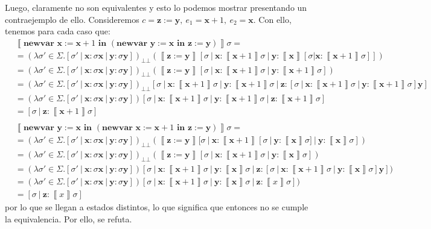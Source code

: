 \documentclass{article}
\newcommand{\sem}[1]{\left\llbracket #1\right\rrbracket}
\newcommand{\x}{\textbf{x}}
\newcommand{\y}{\textbf{y}}
\newcommand{\z}{\textbf{z}}
\newcommand{\bbot}{\bot\!\!\!\bot}
\newcommand{\cnewvar}[3]{\textbf{newvar }#1 := #2\textbf{ in }#3}
\begin{document}
Luego, claramente no son equivalentes y esto lo podemos mostrar presentando un contraejemplo de ello.
Consideremos $c = \z := \y,\ e_1 = \x + 1,\ e_2 = \x$.
Con ello, tenemos para cada caso que:
\begin{equation*}
  \begin{aligned}
    &\sem{\cnewvar{\x}{\x + 1}{(\cnewvar{\y}{\x}{\z := \y})}}\sigma = \\ 
    &= (\lambda \sigma' \in \Sigma . [\sigma'\ |\ \x : \sigma \x\ |\ \y : \sigma \y])_{\bbot} (\sem{\z := \y}[\sigma\ |\ \x : \sem{\x + 1}\sigma\ |\ \y : \sem{\x}[\sigma | \x : \sem{\x + 1}\sigma]]) \\ 
    &= (\lambda \sigma' \in \Sigma . [\sigma'\ |\ \x : \sigma \x\ |\ \y : \sigma \y])_{\bbot} (\sem{\z := \y}[\sigma\ |\ \x : \sem{\x + 1}\sigma\ |\ \y : \sem{\x + 1}\sigma]) \\ 
    &= (\lambda \sigma' \in \Sigma . [\sigma'\ |\ \x : \sigma \x\ |\ \y : \sigma \y])_{\bbot} [\sigma\ |\ \x : \sem{\x + 1}\sigma\ |\ \y : \sem{\x + 1}\sigma\ |\ \z : [\sigma\ |\ \x : \sem{\x + 1}\sigma\ |\ \y : \sem{\x + 1}\sigma] \y] \\
    &= (\lambda \sigma' \in \Sigma . [\sigma'\ |\ \x : \sigma \x\ |\ \y : \sigma \y]) [\sigma\ |\ \x : \sem{\x + 1}\sigma\ |\ \y : \sem{\x + 1}\sigma\ |\ \z : \sem{\x + 1}\sigma] \\ 
    &= [\sigma\ |\ \z : \sem{\x + 1}\sigma] \\ 
    \\ 
    &\sem{\cnewvar{\y}{\x}{(\cnewvar{\x}{\x + 1}{\z := \y})}}\sigma = \\ 
    &= (\lambda \sigma' \in \Sigma . [\sigma'\ |\ \x : \sigma \x\ |\ \y : \sigma \y])_{\bbot} (\sem{\z := \y}[\sigma\ |\ \x : \sem{\x + 1}[\sigma\ |\ \y : \sem{\x}\sigma]\ |\ \y : \sem{\x}\sigma]) \\ 
    &= (\lambda \sigma' \in \Sigma . [\sigma'\ |\ \x : \sigma \x\ |\ \y : \sigma \y])_{\bbot} (\sem{\z := \y}[\sigma\ |\ \x : \sem{\x + 1}\sigma\ |\ \y : \sem{\x}\sigma]) \\ 
    &= (\lambda \sigma' \in \Sigma . [\sigma'\ |\ \x : \sigma \x\ |\ \y : \sigma \y]) [\sigma\ |\ \x : \sem{\x + 1}\sigma\ |\ \y : \sem{\x}\sigma\ |\ \z : [\sigma\ |\ \x : \sem{\x + 1}\sigma\ |\ \y : \sem{\x}\sigma] \y]) \\ 
    &= (\lambda \sigma' \in \Sigma . [\sigma'\ |\ \x : \sigma \x\ |\ \y : \sigma \y]) [\sigma\ |\ \x : \sem{\x + 1}\sigma\ |\ \y : \sem{\x}\sigma\ |\ \z : \sem{x}\sigma]) \\ 
    &= [\sigma\ |\ \z : \sem{x}\sigma]
  \end{aligned}
\end{equation*}
por lo que se llegan a estados distintos, lo que significa que entonces no se cumple la equivalencia.
Por ello, se refuta.
\end{document}
